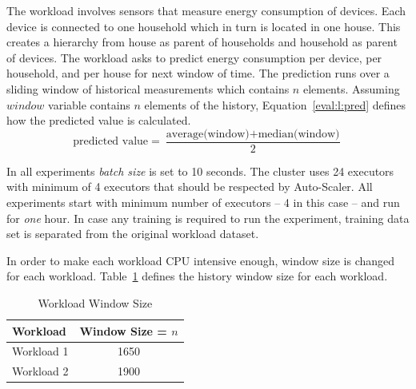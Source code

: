 The workload involves sensors that measure energy consumption of devices. Each device is connected to one household which in turn is located in one house. This creates a hierarchy from house as parent of households and household as parent of devices. The workload asks to predict energy consumption per device, per household, and per house  for next window of time. The prediction runs over a sliding window of historical measurements which contains $n$ elements. Assuming $window$ variable contains $n$ elements of the history, Equation~\ref{eval:l:pred} defines how the predicted value is calculated.
\begin{equation}
\text{predicted value} = \frac{\text{average(window)} + \text{median(window)}}{2}
\label{eval:l:pred}
\end{equation}

In all experiments \emph{batch size} is set to 10 seconds. The cluster uses 24 executors with minimum of 4 executors that should be respected by Auto-Scaler. All experiments start with minimum number of executors -- 4 in this case -- and run for \emph{one} hour. In case any training is required to run the experiment, training data set is separated from the original workload dataset.

In order to make each workload CPU intensive enough, window size is changed for each workload. Table~\ref{eval:tab:history} defines the history window size for each workload.
\begin{table}[h]
    \begin{tabular}{lc}
        \toprule
        \textbf{Workload} & \textbf{Window Size = $n$ }\\
        \midrule
        Workload 1 & 1650\\
        Workload 2 & 1900\\
        \bottomrule
    \end{tabular}
    \centering
    \caption{Workload Window Size}
    \label{eval:tab:history}
\end{table}

\clearpage
